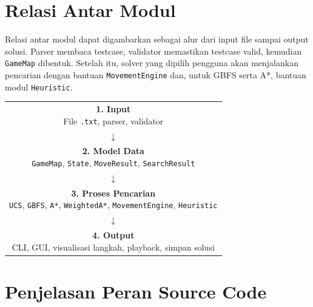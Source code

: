 \endgroup

\section{Relasi Antar Modul}

Relasi antar modul dapat digambarkan sebagai alur dari input file sampai output solusi. 
Parser membaca testcase, validator memastikan testcase valid, kemudian \texttt{GameMap} dibentuk. 
Setelah itu, solver yang dipilih pengguna akan menjalankan pencarian dengan bantuan \texttt{MovementEngine} dan, untuk GBFS serta A*, bantuan modul \texttt{Heuristic}.

\begin{tcolorbox}[
	colback=gray!5,
	colframe=black!60,
	title=\textbf{Diagram Alur Source Program},
	arc=2mm,
	boxrule=0.8pt
]
\small
\begin{center}
\begin{tabular}{c}
\fbox{\parbox{0.82\textwidth}{
\centering
\textbf{1. Input}\\
File \texttt{.txt}, parser, validator
}} \\[0.25cm]
$\downarrow$ \\[-0.05cm]
\fbox{\parbox{0.82\textwidth}{
\centering
\textbf{2. Model Data}\\
\texttt{GameMap}, \texttt{State}, \texttt{MoveResult}, \texttt{SearchResult}
}} \\[0.25cm]
$\downarrow$ \\[-0.05cm]
\fbox{\parbox{0.82\textwidth}{
\centering
\textbf{3. Proses Pencarian}\\
\texttt{UCS}, \texttt{GBFS}, \texttt{A*}, \texttt{WeightedA*}, \texttt{MovementEngine}, \texttt{Heuristic}
}} \\[0.25cm]
$\downarrow$ \\[-0.05cm]
\fbox{\parbox{0.82\textwidth}{
\centering
\textbf{4. Output}\\
CLI, GUI, visualisasi langkah, playback, simpan solusi
}}
\end{tabular}
\end{center}
\end{tcolorbox}

\section{Penjelasan Peran Source Code}

